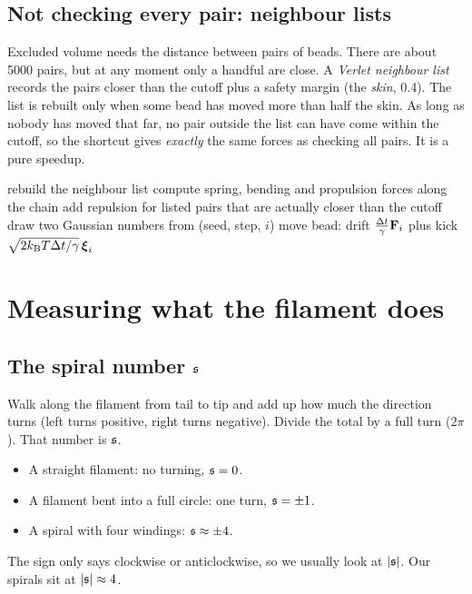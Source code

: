 \documentclass[11pt]{article}
\begin{document}
\subsection{Not checking every pair: neighbour lists}
Excluded volume needs the distance between pairs of beads. There are about 5000 pairs, but at any moment only a handful are close. A \emph{Verlet neighbour list} records the pairs closer than the
cutoff plus a safety margin (the \emph{skin}, 0.4). The list is rebuilt only when some bead has moved more than half the skin. As long as nobody has moved that far, no pair outside the list can
have come within the cutoff, so the shortcut gives \emph{exactly} the same forces as checking all pairs. It is a pure speedup.

\begin{algorithm}[H]
\caption{One simulation step (simplified)}
\begin{algorithmic}[1]
 rebuild the neighbour list \EndIf
\State compute spring, bending and propulsion forces along the chain
\State add repulsion for listed pairs that are actually closer than the cutoff
  \State draw two Gaussian numbers from (seed, step, $i$)
  \State move bead: drift $\frac{\Delta t}{\gamma}\mathbf{F}_i$ plus kick $\sqrt{2k_{\mathrm{B}}T\Delta t/\gamma}\,\boldsymbol\xi_i$
\EndFor
\end{algorithmic}
\end{algorithm}

\section{Measuring what the filament does}
\subsection{The spiral number $\mathfrak{s}$}
Walk along the filament from tail to tip and add up how much the direction turns (left turns positive, right turns negative). Divide the total by a full turn ($2\pi$). That number is $\mathfrak{s}$.
\begin{itemize}
\item A straight filament: no turning, $\mathfrak{s}=0$.
\item A filament bent into a full circle: one turn, $\mathfrak{s}=\pm1$.
\item A spiral with four windings: $\mathfrak{s}\approx\pm4$.
\end{itemize}
The sign only says clockwise or anticlockwise, so we usually look at $|\mathfrak{s}|$. Our spirals sit at $|\mathfrak{s}|\approx4$.
\end{document}
